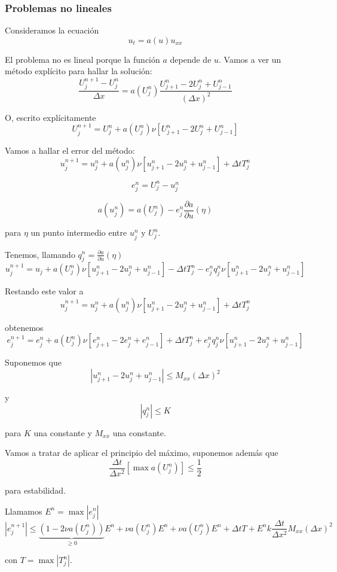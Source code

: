 \subsubsection{Problemas no lineales}
Consideramos la ecuación 
$$u_t = a(u)u_{xx}$$

El problema no es lineal porque la función $a$ depende de $u$. Vamos a ver un método explícito para hallar la solución:
$$\frac{U_j^{n+1}-U_j^n}{\Delta x} = a(U_j^n) \frac{U_{j+1}^{n}-2U_{j}^{n}+U_{j-1}^{n}}{(\Delta x)^2}$$

O, escrito explícitamente
$$U_{j}^{n+1}=U_{j}^{n}+a(U_{j}^{n})\nu \left[U_{j+1}^{n}-2U_{j}^{n}+U_{j-1}^{n}\right]$$

Vamos a hallar el error del método:
$$u_{j}^{n+1}=u_{j}^{n}+a(u_{j}^{n})\nu \left[u_{j+1}^{n}-2u_{j}^{n}+u_{j-1}^{n}\right] + \Delta t T_j^n$$

$$e_j^n = U_j^n - u_j^n$$

$$a(u_j^n) = a(U_j^n) - e_j^n\frac{\partial a}{\partial u}(\eta)$$

para $\eta$ un punto intermedio entre $u_j^n$ y $U_j^n$.

Tenemos, llamando $q_j^n=\frac{\partial a}{\partial u}(\eta)$
$$u_j^{n+1} = u_j + a(U_j^n)\nu \left[u_{j+1}^n-2u_j^n+u_{j-1}^n\right] -\Delta t T_j^n - e_j^nq_j^n\nu \left[u_{j+1}^n-2u_j^n+u_{j-1}^n\right]$$

Restando este valor a 
$$u_{j}^{n+1}=u_{j}^{n}+a(u_{j}^{n})\nu \left[u_{j+1}^{n}-2u_{j}^{n}+u_{j-1}^{n}\right] + \Delta t T_j^n$$

obtenemos
$$e_j^{n+1} = e_j^n + a(U_j^n) \nu\left[e_{j+1}^{n}-2e_{j}^{n}+e_{j-1}^{n}\right] + \Delta tT_j^n + e_j^nq_j^n\nu\left[u_{j+1}^{n}-2u_{j}^{n}+u_{j-1}^{n}\right]$$

Suponemos que
$$|u_{j+1}^n - 2u_j^n + u_{j-1}^n| \le M_{xx}(\Delta x)^2$$

y
$$|q_j^n|\le K$$

para $K$ una constante y $M_{xx}$ una constante.

Vamos a tratar de aplicar el principio del máximo, suponemos además que
$$\frac{\Delta t}{\Delta x^2}\left[\max a(U_j^n)\right] \le \frac{1}{2}$$

para estabilidad.

Llamamos $E^n=\max |e_j^n|$
$$|e_j^{n+1}| \le \underbrace{(1-2\nu a(U_j^n))}_{\ge 0} E^n + \nu a(U_j^n) E^n + \nu a(U_j^n)E^n + \Delta t T + E^n k \frac{\Delta t}{\Delta x^2}M_{xx}(\Delta x)^2$$

con $T=\max |T_j^n|$.

